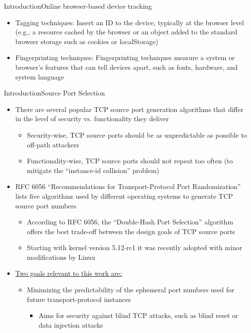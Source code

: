 \documentclass[a4paper]{article}
\begin{document}
\begin{frame}[fragile]{Introduction}{Online browser-based device tracking}
\begin{itemize}
		\item \alert{Tagging techniques:} Insert an ID to the device, typically at the browser level (e.g., a resource cached by the browser or an object added to the standard browser storage such as cookies or localStorage)
		\item \alert{Fingerprinting techniques:} Fingerprinting techniques measure a system or browser’s features that can tell devices apart, such as fonts, hardware, and system language
	\end{itemize}
\end{frame}

\begin{frame}[fragile]{Introduction}{Source Port Selection}
	\begin{itemize}
		\item There are several popular TCP source port generation algorithms that differ in the level of security vs. functionality they deliver
		\begin{itemize}
			\item Security-wise, TCP source ports should be as unpredictable as possible to off-path attackers
			\item Functionality-wise, TCP source ports should not repeat too often (to mitigate the \enquote{instance-id collision} problem)
		\end{itemize}
		\item RFC 6056 \enquote{Recommendations for Transport-Protocol Port Randomization} lists five algorithms used by different operating systems to generate TCP source port numbers
		\begin{itemize}
			\item According to RFC 6056, the \enquote{Double-Hash Port Selection} algorithm offers the best trade-off between the design goals of TCP source ports
			\item Starting with kernel version 5.12-rc1 it was recently adopted with minor modifications by Linux
		\end{itemize}
		\item \underline{Two goals relevant to this work are:}
		\begin{itemize}
			\item Minimizing the predictability of the ephemeral port numbers used for future transport-protocol instances
			\begin{itemize}
				\item Aims for security against blind TCP attacks, such as blind reset or data injection attacks

\end{itemize}
\end{itemize}
\end{itemize}
\end{frame}
\end{document}
